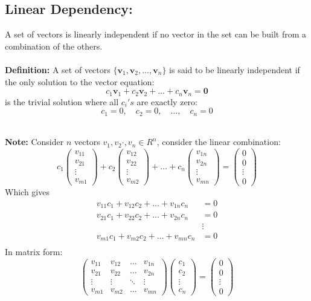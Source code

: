 \documentclass[DIV=20,oneside]{scrartcl}
\newcommand{\note}{
	\noindent\textbf{\\Note: }
}
\newcommand{\deff}{
	\noindent\textbf{\\Definition: }
}
\begin{document}
\subsection{Linear Dependency: }
A set of vectors is linearly independent if no vector in the set can be built from a combination of the others.\\
\deff A set of vectors $\{\mathbf{v}_1, \mathbf{v}_2, \dots, \mathbf{v}_n\}$ is said to be linearly independent if the only solution to the vector equation:$$c_1\mathbf{v}_1 + c_2\mathbf{v}_2 + \dots + c_n\mathbf{v}_n = \mathbf{0}$$is the trivial solution where all $c_i's$ are exactly zero:$$c_1 = 0, \quad c_2 = 0, \quad \dots, \quad c_n = 0$$
\note Consider $n$ vectors $v_1,v_2\cdot ,v_n\in R^n$, consider the linear combination:
$$c_1 \begin{pmatrix} v_{11} \\ v_{21} \\ \vdots \\ v_{m1} \end{pmatrix} + c_2 \begin{pmatrix} v_{12} \\ v_{22} \\ \vdots \\ v_{m2} \end{pmatrix} + \dots + c_n \begin{pmatrix} v_{1n} \\ v_{2n} \\ \vdots \\ v_{mn} \end{pmatrix} = \begin{pmatrix} 0 \\ 0 \\ \vdots \\ 0 \end{pmatrix}$$
Which gives
$$\begin{aligned}
	v_{11}c_1 + v_{12}c_2 + \dots + v_{1n}c_n &= 0 \\
	v_{21}c_1 + v_{22}c_2 + \dots + v_{2n}c_n &= 0 \\
	&\vdots \\
	v_{m1}c_1 + v_{m2}c_2 + \dots + v_{mn}c_n &= 0 \\
\end{aligned}$$
In matrix form:
$$\begin{pmatrix} 
	v_{11} & v_{12} & \dots & v_{1n} \\ 
	v_{21} & v_{22} & \dots & v_{2n} \\ 
	\vdots & \vdots & \ddots & \vdots \\ 
	v_{m1} & v_{m2} & \dots & v_{mn} 
\end{pmatrix}
\begin{pmatrix} c_1 \\ c_2 \\ \vdots \\ c_n \end{pmatrix} = 
\begin{pmatrix} 0 \\ 0 \\ \vdots \\ 0 \end{pmatrix}$$
\end{document}
